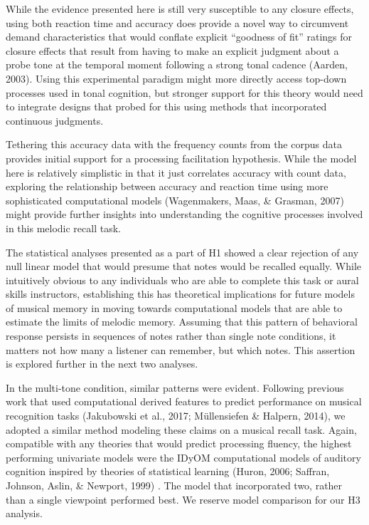 \documentclass[english,man,floatsintext]{apa6}
\begin{document}
While the evidence presented here is still very susceptible to any closure effects, using both reaction time and accuracy does provide a novel way to circumvent demand characteristics that would conflate explicit \enquote{goodness of fit} ratings for closure effects that result from having to make an explicit judgment about a probe tone at the temporal moment following a strong tonal cadence (Aarden, 2003).
Using this experimental paradigm might more directly access top-down processes used in tonal cognition, but stronger support for this theory would need to integrate designs that probed for this using methods that incorporated continuous judgments.

Tethering this accuracy data with the frequency counts from the corpus data provides initial support for a processing facilitation hypothesis.
While the model here is relatively simplistic in that it just correlates accuracy with count data, exploring the relationship between accuracy and reaction time using more sophisticated computational models (Wagenmakers, Maas, \& Grasman, 2007) might provide further insights into understanding the cognitive processes involved in this melodic recall task.

The statistical analyses presented as a part of H1 showed a clear rejection of any null linear model that would presume that notes would be recalled equally.
While intuitively obvious to any individuals who are able to complete this task or aural skills instructors, establishing this has theoretical implications for future models of musical memory in moving towards computational models that are able to estimate the limits of melodic memory.
Assuming that this pattern of behavioral response persists in sequences of notes rather than single note conditions, it matters not how many a listener can remember, but which notes.
This assertion is explored further in the next two analyses.

In the multi-tone condition, similar patterns were evident. Following previous work that used computational derived features to predict performance on musical recognition tasks (Jakubowski et al., 2017; Müllensiefen \& Halpern, 2014), we adopted a similar method modeling these claims on a musical recall task.
Again, compatible with any theories that would predict processing fluency, the highest performing univariate models were the IDyOM computational models of auditory cognition inspired by theories of statistical learning (Huron, 2006; Saffran, Johnson, Aslin, \& Newport, 1999) .
The model that incorporated two, rather than a single viewpoint performed best.
We reserve model comparison for our H3 analysis.
\end{document}
